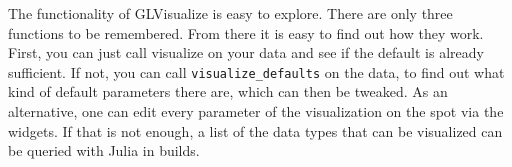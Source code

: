 The functionality of GLVisualize is easy to explore. There are only three functions to be remembered. From there it is easy to find out how they work. First, you can just call visualize on your data and see if the default is already sufficient. If not, you can call \texttt{visualize\_defaults} on the data, to find out what kind of default parameters there are, which can then be tweaked. As an alternative, one can edit every parameter of the visualization on the spot via the widgets. 
If that is not enough, a list of the data types that can be visualized can be queried with Julia in builds.


